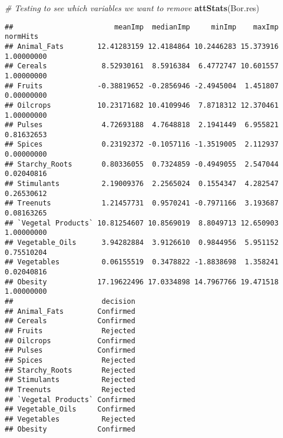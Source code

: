 \documentclass[
]{article}
\newenvironment{Shaded}{\begin{snugshade}}{\end{snugshade}}
\newcommand{\CommentTok}[1]{\textcolor[rgb]{0.56,0.35,0.01}{\textit{#1}}}
\newcommand{\KeywordTok}[1]{\textcolor[rgb]{0.13,0.29,0.53}{\textbf{#1}}}
\newcommand{\NormalTok}[1]{#1}
\newcommand{\OperatorTok}[1]{\textcolor[rgb]{0.81,0.36,0.00}{\textbf{#1}}}
\newcommand{\StringTok}[1]{\textcolor[rgb]{0.31,0.60,0.02}{#1}}
\begin{document}
\begin{Shaded}
\begin{Highlighting}[]
\CommentTok{# Testing to see which variables we want to remove}
\KeywordTok{attStats}\NormalTok{(Bor.res)}
\end{Highlighting}
\end{Shaded}

\begin{verbatim}
##                        meanImp  medianImp     minImp    maxImp   normHits
## Animal_Fats        12.41283159 12.4184864 10.2446283 15.373916 1.00000000
## Cereals             8.52930161  8.5916384  6.4772747 10.601557 1.00000000
## Fruits             -0.38819652 -0.2856946 -2.4945004  1.451807 0.00000000
## Oilcrops           10.23171682 10.4109946  7.8718312 12.370461 1.00000000
## Pulses              4.72693188  4.7648818  2.1941449  6.955821 0.81632653
## Spices              0.23192372 -0.1057116 -1.3519005  2.112937 0.00000000
## Starchy_Roots       0.80336055  0.7324859 -0.4949055  2.547044 0.02040816
## Stimulants          2.19009376  2.2565024  0.1554347  4.282547 0.26530612
## Treenuts            1.21457731  0.9570241 -0.7971166  3.193687 0.08163265
## `Vegetal Products` 10.81254607 10.8569019  8.8049713 12.650903 1.00000000
## Vegetable_Oils      3.94282884  3.9126610  0.9844956  5.951152 0.75510204
## Vegetables          0.06155519  0.3478822 -1.8838698  1.358241 0.02040816
## Obesity            17.19622496 17.0334898 14.7967766 19.471518 1.00000000
##                     decision
## Animal_Fats        Confirmed
## Cereals            Confirmed
## Fruits              Rejected
## Oilcrops           Confirmed
## Pulses             Confirmed
## Spices              Rejected
## Starchy_Roots       Rejected
## Stimulants          Rejected
## Treenuts            Rejected
## `Vegetal Products` Confirmed
## Vegetable_Oils     Confirmed
## Vegetables          Rejected
## Obesity            Confirmed
\end{verbatim}

\begin{Shaded}
\end{Shaded}
\end{document}
